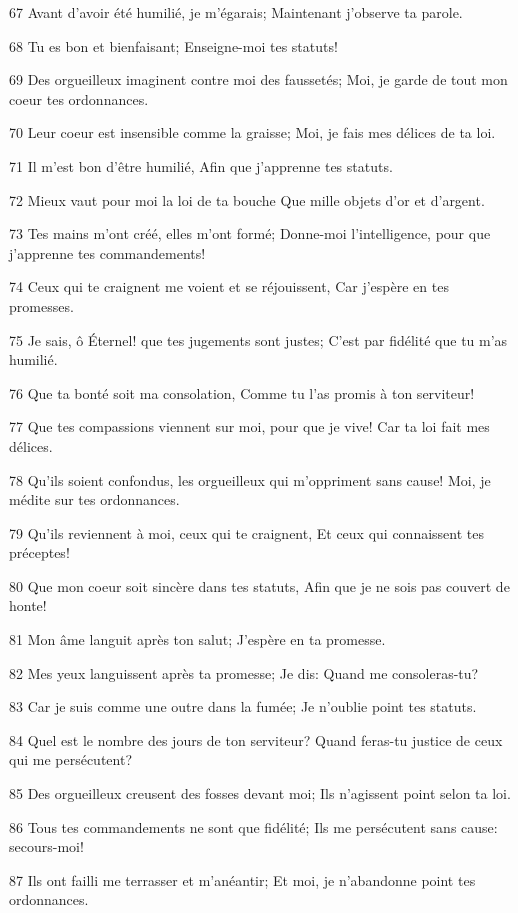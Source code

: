 \par 67 Avant d'avoir été humilié, je m'égarais; Maintenant j'observe ta parole.
\par 68 Tu es bon et bienfaisant; Enseigne-moi tes statuts!
\par 69 Des orgueilleux imaginent contre moi des faussetés; Moi, je garde de tout mon coeur tes ordonnances.
\par 70 Leur coeur est insensible comme la graisse; Moi, je fais mes délices de ta loi.
\par 71 Il m'est bon d'être humilié, Afin que j'apprenne tes statuts.
\par 72 Mieux vaut pour moi la loi de ta bouche Que mille objets d'or et d'argent.
\par 73 Tes mains m'ont créé, elles m'ont formé; Donne-moi l'intelligence, pour que j'apprenne tes commandements!
\par 74 Ceux qui te craignent me voient et se réjouissent, Car j'espère en tes promesses.
\par 75 Je sais, ô Éternel! que tes jugements sont justes; C'est par fidélité que tu m'as humilié.
\par 76 Que ta bonté soit ma consolation, Comme tu l'as promis à ton serviteur!
\par 77 Que tes compassions viennent sur moi, pour que je vive! Car ta loi fait mes délices.
\par 78 Qu'ils soient confondus, les orgueilleux qui m'oppriment sans cause! Moi, je médite sur tes ordonnances.
\par 79 Qu'ils reviennent à moi, ceux qui te craignent, Et ceux qui connaissent tes préceptes!
\par 80 Que mon coeur soit sincère dans tes statuts, Afin que je ne sois pas couvert de honte!
\par 81 Mon âme languit après ton salut; J'espère en ta promesse.
\par 82 Mes yeux languissent après ta promesse; Je dis: Quand me consoleras-tu?
\par 83 Car je suis comme une outre dans la fumée; Je n'oublie point tes statuts.
\par 84 Quel est le nombre des jours de ton serviteur? Quand feras-tu justice de ceux qui me persécutent?
\par 85 Des orgueilleux creusent des fosses devant moi; Ils n'agissent point selon ta loi.
\par 86 Tous tes commandements ne sont que fidélité; Ils me persécutent sans cause: secours-moi!
\par 87 Ils ont failli me terrasser et m'anéantir; Et moi, je n'abandonne point tes ordonnances.
